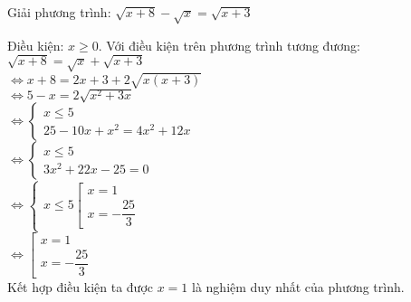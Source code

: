 \begin{baitap}
 Giải phương trình: $ \sqrt{x+8 } - \sqrt{x } = \sqrt{x + 3}    $
\begin{loigiai1}
Điều kiện: $ x \geq 0 $.
Với điều kiện trên phương trình tương đương: $ \sqrt{x+8 } = \sqrt{x } + \sqrt{x + 3}  $ \\
$ \Leftrightarrow x+8 = 2x +3 + 2 \sqrt{x(x+3 ) } $ \\
$ \Leftrightarrow 5-x = 2 \sqrt{x^2 + 3x } $ \\
$ \Leftrightarrow \begin{cases}
    x \leq 5 \\
    25 -10x + x^2 = 4x^2 + 12x
\end{cases} $ \\
$ \Leftrightarrow \begin{cases}
    x \leq 5 \\
    3x^2 +22x -25 =0
\end{cases} $ \\
$ \Leftrightarrow \begin{cases}
    x \leq 5
    \left[
        \begin{array}{l}
            x =1 \\
            x= -\dfrac{25 }{3 }  
        \end{array}
    \right. 
\end{cases} $ \\
$ \Leftrightarrow \left[
    \begin{array}{l}
        x =1 \\
        x=-\dfrac{25 }{3 }  
    \end{array}
\right. $ \\
Kết hợp điều kiện ta được $x=1$ là nghiệm duy nhất của phương trình.
\end{loigiai1}

\end{baitap}
